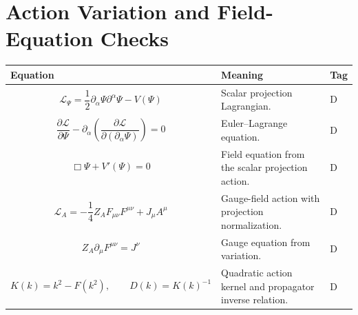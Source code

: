 \documentclass[11pt]{article}
\begin{document}
\section{Action Variation and Field-Equation Checks}
\begin{longtable}{>{\raggedright\arraybackslash}p{} >{\raggedright\arraybackslash}p{} >{\centering\arraybackslash}p{}}
\toprule
\textbf{Equation} & \textbf{Meaning} & \textbf{Tag} \\
\midrule
\endhead

\begin{equation}
\mathcal L_\Psi=\frac12\partial_\alpha\Psi\partial^\alpha\Psi-V(\Psi)
\end{equation}
& Scalar projection Lagrangian. & D \\

\begin{equation}
\frac{\partial \mathcal L}{\partial \Psi}-\partial_\alpha\left(\frac{\partial\mathcal L}{\partial(\partial_\alpha\Psi)}\right)=0
\end{equation}
& Euler--Lagrange equation. & D \\

\begin{equation}
\Box\Psi+V'(\Psi)=0
\end{equation}
& Field equation from the scalar projection action. & D \\

\begin{equation}
\mathcal L_A=-\frac14Z_AF_{\mu\nu}F^{\mu\nu}+J_\mu A^\mu
\end{equation}
& Gauge-field action with projection normalization. & D \\

\begin{equation}
Z_A\partial_\mu F^{\mu\nu}=J^\nu
\end{equation}
& Gauge equation from variation. & D \\

\begin{equation}
K(k)=k^2-F(k^2),
\qquad D(k)=K(k)^{-1}
\end{equation}
& Quadratic action kernel and propagator inverse relation. & D \\

\bottomrule
\end{longtable}
\end{document}
